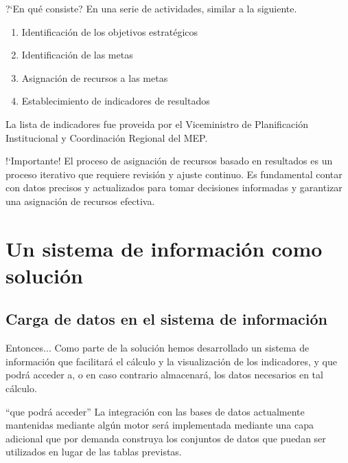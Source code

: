 \documentclass[xcolor=table, aspectratio=169]{beamer}
\begin{document}
\begin{frame}[t]{?`En qu\'e consiste?}
    En una serie de actividades, similar a la siguiente.
    
	\begin{enumerate}
		\item Identificaci\'on de los objetivos estrat\'egicos
		\item Identificaci\'on de las metas
		\item Asignaci\'on de recursos a las metas
		\item Establecimiento de indicadores de resultados
	\end{enumerate}
	
	La lista de indicadores fue proveida por el Viceministro de Planificaci\'on Institucional y Coordinaci\'on Regional del MEP.
		
	\begin{block}{!`Importante!}
		El proceso de asignaci\'on de recursos basado en resultados es un proceso iterativo que requiere revisi\'on y ajuste continuo. Es fundamental contar con datos precisos y actualizados para tomar decisiones informadas y garantizar una asignaci\'on de recursos efectiva.
	\end{block}
\end{frame}

\section{Un sistema de informaci\'on como soluci\'on}

\subsection{Carga de datos en el sistema de informaci\'on}

\begin{frame}[t]{Entonces...}
    Como parte de la soluci\'on hemos desarrollado un sistema de informaci\'on que facilitar\'a el c\'alculo y la visualizaci\'on de los indicadores, y que podr\'a acceder a, o en caso contrario almacenar\'a, los datos necesarios en tal c\'alculo.

    \begin{block}{``que podr\'a acceder''}
		La integraci\'on con las bases de datos actualmente mantenidas mediante alg\'un motor ser\'a implementada mediante una capa adicional que por demanda construya los conjuntos de datos que puedan ser utilizados en lugar de las tablas previstas.
	\end{block}
\end{frame}
\end{document}
